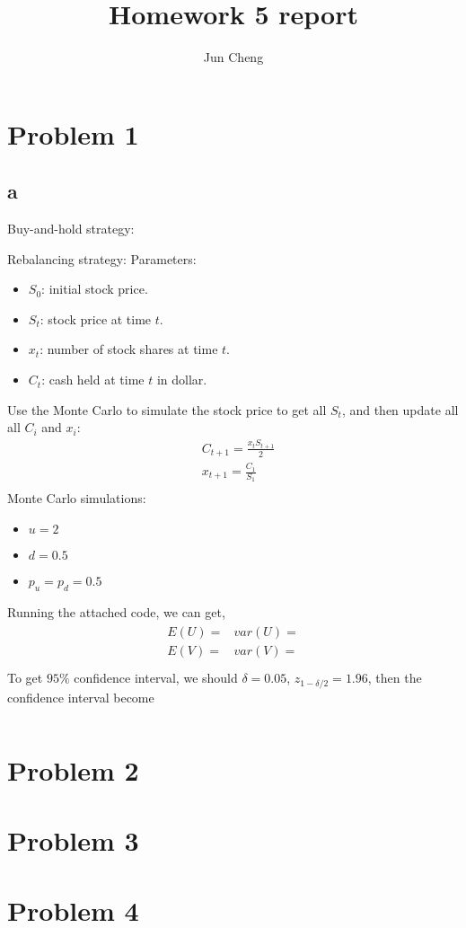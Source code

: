 \documentclass{report}
\begin{document}
\title{Homework 5 report}
\author{Jun Cheng}
\maketitle

\section*{Problem 1} 
\subsection*{a} 
Buy-and-hold strategy: 

Rebalancing strategy: 
Parameters: 
\begin{itemize}
\item $S_0$: initial stock price.
\item $S_t$: stock price at time $t$.
\item $x_t$: number of stock shares at time $t$.
\item $C_t$: cash held at time $t$ in dollar. 
\end{itemize}
Use the Monte Carlo to simulate the stock price to get all $S_t$,  and then update all all $C_i $ and $x_i$: 
\begin{align*}
&C_{t+1}=\frac{x_tS_{t+1}}{2} \\
&x_{t+1}=\frac{C_1}{S_1}\\
\end{align*}
Monte Carlo simulations: 
\begin{itemize}
\item $ u=2$
\item $ d=0.5$
\item $p_u = p_d = 0.5$
\end{itemize} 
Running the attached code, we can get, 
\begin{align*}\begin{array}{ll}
E(U)=  & var(U) =\\
E(V)=   & var(V)=\\
\end{array} \end{align*}
To get $95\% $ confidence interval, we should $\delta = 0.05$, $z_{1-\delta/2}=1.96$, then the confidence interval become 
\begin{align*}
[\hat{Y}-1.96\frac{\sigma}{\sqrt{n}}, \hat{Y}+1.96\frac{\sigma}{\sqrt{n}}]
[   ,  ]\\
\end{align*}
\section*{Problem 2}

\section*{Problem 3}

\section*{Problem 4} 
\end{document}
